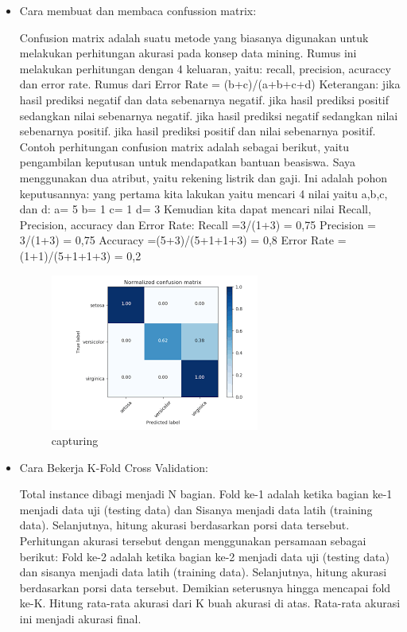\begin{enumerate}
\begin{itemize}
\item Cara membuat dan membaca confussion matrix:

Confusion matrix adalah suatu metode yang biasanya digunakan untuk melakukan perhitungan akurasi pada konsep data mining. Rumus ini melakukan perhitungan dengan 4 keluaran, yaitu: recall, precision, acuraccy dan error rate.
Rumus dari Error Rate = (b+c)/(a+b+c+d)
Keterangan:
jika hasil prediksi negatif dan data sebenarnya negatif.
jika hasil prediksi positif sedangkan nilai sebenarnya negatif.
jika hasil prediksi negatif sedangkan nilai sebenarnya positif.
jika hasil prediksi positif dan nilai sebenarnya positif.
Contoh perhitungan confusion matrix adalah sebagai berikut, yaitu pengambilan keputusan untuk mendapatkan bantuan beasiswa. Saya menggunakan dua atribut, yaitu rekening listrik dan gaji. Ini adalah pohon keputusannya:
yang pertama kita lakukan yaitu mencari 4 nilai yaitu a,b,c, dan d:
a= 5
b= 1
c= 1
d= 3
Kemudian kita dapat mencari nilai Recall, Precision, accuracy dan Error Rate:
Recall =3/(1+3) = 0,75
Precision = 3/(1+3) = 0,75
Accuracy =(5+3)/(5+1+1+3) = 0,8
Error Rate =(1+1)/(5+1+1+3) = 0,2

\begin{figure}[ht]
\centering
\includegraphics[scale=0.5]{figures/Chapter2-AnnisaFathoroni4.png}
\caption{capturing}
\label{contoh}
\end{figure}

\item Cara Bekerja K-Fold Cross Validation:

Total instance dibagi menjadi N bagian. 
Fold ke-1 adalah ketika bagian ke-1 menjadi data uji (testing data) dan 
Sisanya menjadi data latih (training data). Selanjutnya, hitung akurasi berdasarkan porsi data tersebut. Perhitungan akurasi tersebut dengan menggunakan persamaan sebagai berikut: 
Fold ke-2 adalah ketika bagian ke-2 menjadi data uji (testing data) dan sisanya menjadi data latih (training data). Selanjutnya, hitung akurasi berdasarkan porsi data tersebut.  
Demikian seterusnya hingga mencapai fold ke-K. Hitung rata-rata akurasi dari K buah akurasi di atas. Rata-rata akurasi ini menjadi akurasi final.


\end{itemize}
\end{enumerate}
